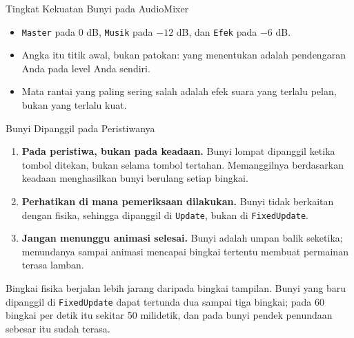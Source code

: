 \documentclass[aspectratio=169,10pt]{beamer}
\begin{document}
\begin{frame}{Tingkat Kekuatan Bunyi pada AudioMixer}
\centering
{}
\vspace{0.10cm}
\begin{itemize}
  \item \texttt{Master} pada 0 dB, \texttt{Musik} pada $-12$ dB, dan
        \texttt{Efek} pada $-6$ dB.
  \item Angka itu titik awal, bukan patokan: yang menentukan adalah pendengaran
        Anda pada level Anda sendiri.
  \item Mata rantai yang paling sering salah adalah efek suara yang terlalu
        pelan, bukan yang terlalu kuat.
\end{itemize}
\end{frame}

\begin{frame}{Bunyi Dipanggil pada Peristiwanya}
\begin{enumerate}
  \item \textbf{Pada peristiwa, bukan pada keadaan.} Bunyi lompat dipanggil
        ketika tombol ditekan, bukan selama tombol tertahan. Memanggilnya
        berdasarkan keadaan menghasilkan bunyi berulang setiap bingkai.
  \item \textbf{Perhatikan di mana pemeriksaan dilakukan.} Bunyi tidak
        berkaitan dengan fisika, sehingga dipanggil di \texttt{Update}, bukan
        di \texttt{FixedUpdate}.
  \item \textbf{Jangan menunggu animasi selesai.} Bunyi adalah umpan balik
        seketika; menundanya sampai animasi mencapai bingkai tertentu membuat
        permainan terasa lamban.
\end{enumerate}
\vspace{0.14cm}
\begin{peringatan}
Bingkai fisika berjalan lebih jarang daripada bingkai tampilan. Bunyi yang baru
dipanggil di \texttt{FixedUpdate} dapat tertunda dua sampai tiga bingkai; pada
60 bingkai per detik itu sekitar 50 milidetik, dan pada bunyi pendek penundaan
sebesar itu sudah terasa.
\end{peringatan}
\end{frame}
\end{document}
